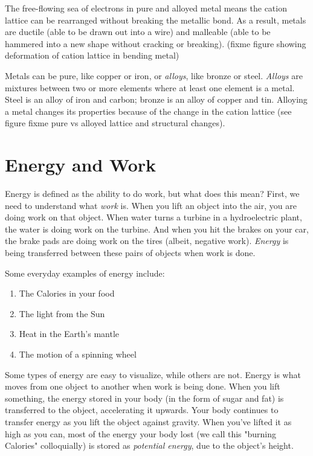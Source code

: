 The free-flowing sea of electrons in pure and alloyed metal means the cation 
lattice can be rearranged without breaking the metallic bond. As a result, metals 
are ductile (able to be drawn out into a wire) and malleable (able to be hammered 
into a new shape without cracking or breaking). (fixme figure showing deformation of cation lattice in bending metal)

Metals can be pure, like copper or iron, or \textit{alloys}, like bronze or steel. 
\textit{Alloys} are mixtures between two or more elements where at least one 
element is a metal. Steel is an alloy of iron and carbon; bronze is 
an alloy of copper and tin. Alloying a metal changes its properties because of 
the change in the cation lattice (see figure fixme pure vs alloyed lattice and 
structural changes). 

\section{Energy and Work}

Energy is defined as the ability to do work, but what does this mean? First, we 
need to understand what \textit{work} is. When you lift an object into the air, 
you are doing work on that object. When water turns a turbine in a hydroelectric 
plant, the water is doing work on the turbine. And when you hit the brakes on your
car, the brake pads are doing work on the tires (albeit, negative work). 
\textit{Energy} is being transferred between these pairs of objects when work is 
done. 

Some everyday examples of energy include:
\begin{enumerate}
\item The Calories in your food
\item The light from the Sun
\item Heat in the Earth's mantle
\item The motion of a spinning wheel
\end{enumerate}

Some types of energy are easy to visualize, while others are not. Energy is what 
moves from one object to another when work is being done. When you lift 
something, the energy stored in your body (in the form of sugar and fat) is 
transferred to the object, accelerating it upwards. Your body continues to 
transfer energy as you lift the object against gravity. When you've lifted it as 
high as you can, most of the energy your body lost (we call this "burning 
Calories" colloquially) is stored as \textit{potential energy}, due to the 
object's height. 


